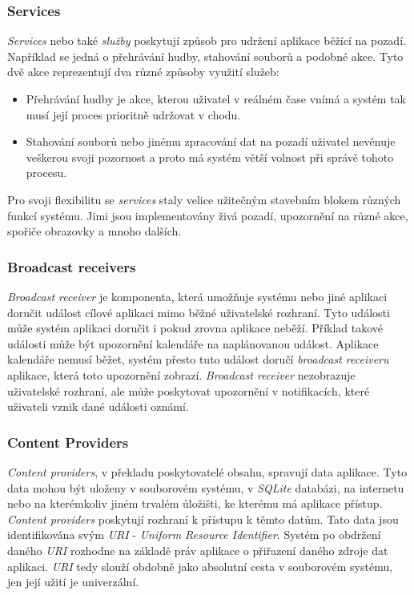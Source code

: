         \subsubsection{Services}
        \emph{Services} nebo také \emph{služby} poskytují způsob pro udržení aplikace běžící na pozadí. Například se jedná o přehrávání hudby, stahování souborů a podobné akce. Tyto dvě akce reprezentují dva různé způsoby využití služeb:
        \begin{itemize}
            \item Přehrávání hudby je akce, kterou uživatel v reálném čase vnímá a systém tak musí její proces prioritně udržovat v chodu.
            \item Stahování souborů nebo jinému zpracování dat na pozadí uživatel nevěnuje veškerou svoji pozornost a proto má systém větší volnost při správě tohoto procesu.
        \end{itemize}
        Pro svoji flexibilitu se \emph{services} staly velice užitečným stavebním blokem různých funkcí systému. Jimi jsou implementovány živá pozadí, upozornění na různé akce, spořiče obrazovky a mnoho dalších.
        
        \subsubsection{Broadcast receivers}
        \emph{Broadcast receiver} je komponenta, která umožňuje systému nebo jiné aplikaci doručit událost cílové aplikaci mimo běžné uživatelské rozhraní. Tyto události může systém aplikaci doručit i pokud zrovna aplikace neběží. Příklad takové události může být upozornění kalendáře na naplánovanou událost. Aplikace kalendáře nemusí běžet, systém přesto tuto událost doručí \emph{broadcast receiveru} aplikace, která toto upozornění zobrazí. \emph{Broadcast receiver} nezobrazuje uživatelské rozhraní, ale může poskytovat upozornění v notifikacích, které uživateli vznik dané události oznámí.

        \subsubsection{Content Providers}
        \emph{Content providers}, v překladu poskytovatelé obsahu, spravují data aplikace. Tyto data mohou být uloženy v souborovém systému, v \emph{SQLite} databázi, na internetu nebo na kterémkoliv jiném trvalém úložišti, ke kterému má aplikace přístup. \emph{Content providers} poskytují rozhraní k přístupu k těmto datům. Tato data jsou identifikována svým \emph{URI} - \emph{Uniform Resource Identifier}. Systém po obdržení daného \emph{URI} rozhodne na základě práv aplikace o přiřazení daného zdroje dat aplikaci. \emph{URI} tedy slouží obdobně jako absolutní cesta v souborovém systému, jen její užití je univerzální.

